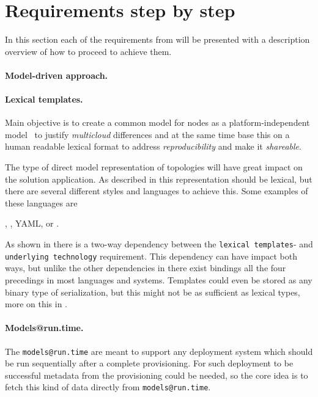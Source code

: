 \section{Requirements step by step}

In this section each of the requirements from  will be presented 
with a description overview of how to proceed to achieve them.


\paragraph{Model-driven approach.}


\paragraph{Lexical templates.}

Main objective is to create a common model for nodes as a platform-independent 
model~\cite{agile:cuong10} to justify \emph{multicloud} differences and 
at the same time base this on a human readable lexical format to address \emph{reproducibility} and
make it \emph{shareable}.

The type of direct model representation of topologies will have great impact 
on the solution application.
As described in  this representation should be lexical,
but there are several different styles and languages to achieve this.
Some examples of these languages are 
\begin{ii}
  \iitem {},
  \iitem {},
  \iitem YAML,
  \iitem {} or
  \iitem {}.
\end{ii}
As shown in  there is a two-way dependency between 
the \texttt{lexical templates}- and \texttt{underlying technology} requirement.
This dependency can have impact both ways, but unlike the other dependencies in
 there exist bindings all the four precedings in
most languages and systems.
Templates could even be stored as any binary type of serialization, 
but this might not be as sufficient as lexical types, more on this
in .

\paragraph{Models@run.time.}

The \texttt{models@run.time} are meant to support any deployment system which should
be run sequentially after a complete provisioning.
For such deployment to be successful metadata from the provisioning could be needed,
so the core idea is to fetch this kind of data directly from \texttt{models@run.time}.

